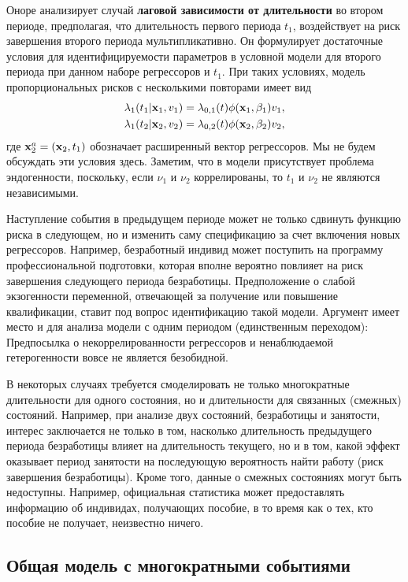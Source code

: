 Оноре анализирует случай \textbf{лаговой зависимости от длительности} во втором периоде, предполагая, что длительность первого периода $t_1$, воздействует на риск завершения второго периода мультипликативно. Он формулирует достаточные условия для идентифицируемости параметров в условной модели для второго периода при данном наборе регрессоров и $t_1$. При таких условиях, модель пропорциональных рисков с несколькими повторами имеет вид
        \begin{align}\label{eq:19.25}
        \lambda_1(t_1|\mathbf{x}_1,v_1) &= \lambda_{0,1}(t) \phi(\mathbf{x}_1,\beta_1)v_1, \\
        \lambda_1(t_2|\mathbf{x}_2,v_2) &= \lambda_{0,2}(t) \phi(\mathbf{x}_2,\beta_2)v_2, \notag
        \end{align}
где $\mathbf{x}^{a}_{2} = (\mathbf{x}_2, t_1)$ обозначает расширенный вектор регрессоров. Мы не будем обсуждать эти условия здесь. Заметим, что в модели присутствует проблема эндогенности, поскольку, если $\nu_1$ и $\nu_2$ коррелированы, то $t_1$ и $\nu_2$ не являются независимыми.

Наступление события в предыдущем периоде может не только сдвинуть функцию риска в следующем, но и изменить саму спецификацию за счет включения новых регрессоров. Например, безработный индивид может поступить на программу профессиональной подготовки, которая вполне вероятно повлияет на риск завершения следующего периода безработицы. Предположение о слабой экзогенности переменной, отвечающей за получение или повышение квалификации, ставит под вопрос идентификацию такой модели. Аргумент имеет место и для анализа модели с одним периодом (единственным переходом): Предпосылка о некоррелированности регрессоров и ненаблюдаемой гетерогенности вовсе не является безобидной.

В некоторых случаях требуется смоделировать не только многократные длительности для одного состояния, но и длительности для связанных (смежных) состояний. Например, при анализе двух состояний, безработицы и занятости, интерес заключается не только в том, насколько длительность предыдущего периода безработицы влияет на длительность текущего, но и в том, какой эффект оказывает период занятости на последующую вероятность найти работу (риск завершения безработицы). Кроме того, данные о смежных состояниях могут быть недоступны. Например, официальная статистика может предоставлять информацию об индивидах, получающих пособие, в то время как о тех, кто пособие не получает, неизвестно ничего.




\subsection{Общая модель с многократными событиями}\label{sec:19.4.2}

